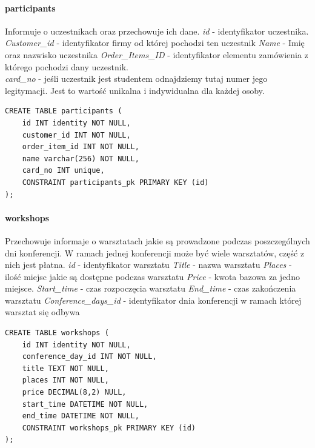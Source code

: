 \documentclass[12pt]{article}
\begin{document}
\paragraph{participants \newline}
Informuje o uczestnikach oraz przechowuje ich dane. \newline \newline
\textit{id} - identyfikator uczestnika.\newline
\textit{Customer\_id} - identyfikator firmy od której pochodzi ten uczestnik \newline
\textit{Name} - Imię oraz nazwisko uczestnika \newline
\textit{Order\_Items\_ID} - identyfikator elementu zamówienia z którego pochodzi dany uczestnik.\\
\textit{card\_no} - jeśli uczestnik jest studentem odnajdziemy tutaj numer jego legitymacji. Jest to wartość unikalna i indywidualna dla każdej osoby.
\begin{lstlisting}
CREATE TABLE participants (
	id INT identity NOT NULL,
	customer_id INT NOT NULL,
	order_item_id INT NOT NULL,
	name varchar(256) NOT NULL,
	card_no INT unique,
	CONSTRAINT participants_pk PRIMARY KEY (id)
);
\end{lstlisting}
\paragraph{workshops \newline}
Przechowuje informaje o warsztatach jakie są prowadzone podczas poszczególnych dni konferencji. W ramach jednej konferencji może być wiele warsztatów, część z nich jest płatna.\newline \newline
\textit{id} - identyfikator warsztatu \newline
\textit{Title} - nazwa warsztatu \newline
\textit{Places} - ilość miejsc jakie są dostępne podczas warsztatu \newline
\textit{Price} - kwota bazowa za jedno miejsce. \newline
\textit{Start\_time} - czas rozpoczęcia warsztatu \newline
\textit{End\_time} - czas zakończenia warsztatu \newline
\textit{Conference\_days\_id} - identyfikator dnia konferencji w ramach której warsztat się odbywa \newline
\begin{lstlisting}
CREATE TABLE workshops (
	id INT identity NOT NULL,
	conference_day_id INT NOT NULL,
	title TEXT NOT NULL,
	places INT NOT NULL,
	price DECIMAL(8,2) NULL,
	start_time DATETIME NOT NULL,
	end_time DATETIME NOT NULL,
	CONSTRAINT workshops_pk PRIMARY KEY (id)
);

\end{lstlisting}
\end{document}
